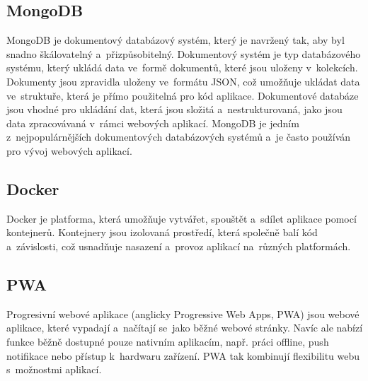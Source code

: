 \subsection{MongoDB}\label{mongo} MongoDB je dokumentový databázový systém, který je navržený tak, aby byl snadno škálovatelný a~přizpůsobitelný. Dokumentový systém je typ databázového systému, který ukládá data ve~formě dokumentů, které jsou uloženy v~kolekcích. Dokumenty jsou zpravidla uloženy ve~formátu JSON, což umožňuje ukládat data ve~struktuře, která je přímo použitelná pro kód aplikace. Dokumentové databáze jsou vhodné pro ukládání dat, která jsou složitá a~nestrukturovaná, jako jsou data zpracovávaná v~rámci webových aplikací. MongoDB je jedním z~nejpopulárnějších dokumentových databázových systémů a~je často používán pro vývoj webových aplikací.

\subsection{Docker} Docker je platforma, která umožňuje vytvářet, spouštět a~sdílet aplikace pomocí kontejnerů. Kontejnery jsou izolovaná prostředí, která společně balí kód a~závislosti, což usnadňuje nasazení a~provoz aplikací na~různých platformách. \cite{docker}

\subsection{PWA}\label{pwa} Progresivní webové aplikace (anglicky Progressive Web Apps, PWA) jsou webové aplikace, které vypadají a~načítají se~jako běžné webové stránky. Navíc ale nabízí funkce běžně dostupné pouze nativním aplikacím, např. práci offline, push notifikace nebo přístup k~hardwaru zařízení. PWA tak kombinují flexibilitu webu s~možnostmi aplikací. \cite{pwa}